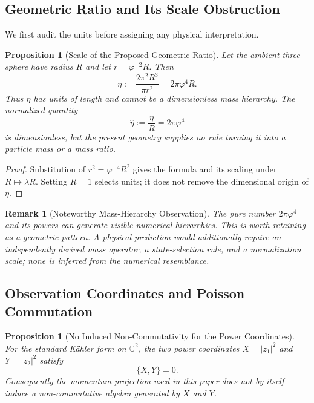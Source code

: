 \documentclass[11pt]{article}
\newtheorem{proposition}[theorem]{Proposition}
\newtheorem{remark}[theorem]{Remark}
\begin{document}
\subsection{Geometric Ratio and Its Scale Obstruction}

We first audit the units before assigning any physical interpretation.

\begin{proposition}[Scale of the Proposed Geometric Ratio]
\label{prop:mass_scale_obstruction}
Let the ambient three-sphere have radius $R$ and let
$r=\varphi^{-2}R$.  Then
\[
 \eta
 :=\frac{2\pi^2R^3}{\pi r^2}
 =2\pi\varphi^4R.
\]
Thus $\eta$ has units of length and cannot be a dimensionless mass hierarchy.
The normalized quantity
\[
 \widehat\eta:=\frac{\eta}{R}=2\pi\varphi^4
\]
is dimensionless, but the present geometry supplies no rule turning it into
a particle mass or a mass ratio.
\end{proposition}

\begin{proof}
Substitution of $r^2=\varphi^{-4}R^2$ gives the formula and its scaling under
$R\mapsto\lambda R$.  Setting $R=1$ selects units; it does not remove the
dimensional origin of $\eta$.
\end{proof}

\begin{remark}[Noteworthy Mass-Hierarchy Observation]
The pure number $2\pi\varphi^4$ and its powers can generate visible numerical
hierarchies.  This is worth retaining as a geometric pattern.  A physical
prediction would additionally require an independently derived mass operator,
a state-selection rule, and a normalization scale; none is inferred from the
numerical resemblance.
\end{remark}

\subsection{Observation Coordinates and Poisson Commutation}

\begin{proposition}[No Induced Non-Commutativity for the Power Coordinates]
\label{prop:poisson_commute}
For the standard K\"ahler form on $\mathbb C^2$, the two power coordinates
$X=|z_1|^2$ and $Y=|z_2|^2$ satisfy
\[
 \{X,Y\}=0.
\]
Consequently the momentum projection used in this paper does not by itself
induce a non-commutative algebra generated by $X$ and $Y$.
\end{proposition}
\end{document}
